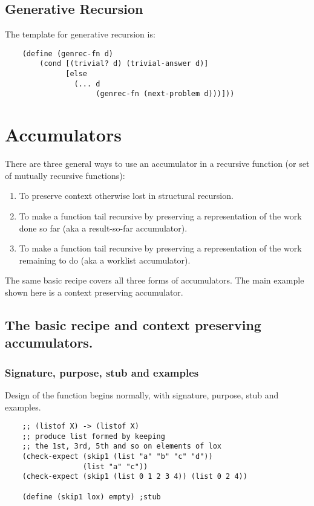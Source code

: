 \documentclass[11pt,a4paper]{report}
\begin{document}
	\section{Generative Recursion} \label{sec:gen_recur}
	The template for generative recursion is:
	
	\begin{verbatim}
	(define (genrec-fn d)
		(cond [(trivial? d) (trivial-answer d)]
		      [else
		        (... d
		             (genrec-fn (next-problem d)))]))
	\end{verbatim}
	
	\chapter{Accumulators} \label{ch:accumulators}
	There are three general ways to use an accumulator in a recursive function (or set of mutually
	recursive functions):
	\begin{enumerate}
		\item To preserve context otherwise lost in structural recursion.
		\item To make a function tail recursive by preserving a representation of the work done so far (aka a
		result-so-far accumulator).
		\item To make a function tail recursive by preserving a representation of the work remaining to do
		(aka a worklist accumulator).
	\end{enumerate}
	
	The same basic recipe covers all three forms of accumulators. The main example shown here is a
	context preserving accumulator.
	
	\section{The basic recipe and context preserving accumulators.}
	\subsection*{Signature, purpose, stub and examples}
	Design of the function begins normally, with signature, purpose, stub and examples.
	
	\begin{verbatim}
	;; (listof X) -> (listof X)
	;; produce list formed by keeping 
	;; the 1st, 3rd, 5th and so on elements of lox
	(check-expect (skip1 (list "a" "b" "c" "d")) 
	              (list "a" "c"))
	(check-expect (skip1 (list 0 1 2 3 4)) (list 0 2 4))
	
	(define (skip1 lox) empty) ;stub
	\end{verbatim}
	
\end{document}
